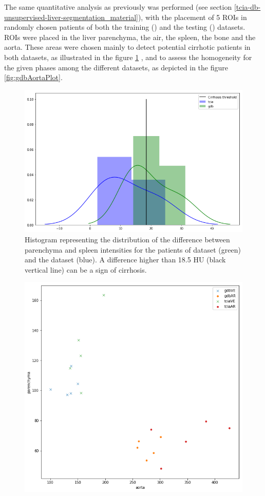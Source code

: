 {\begin{figure}[!ht]
\end{figure}
The same quantitative analysis as previously was performed (see section \ref{tcia-db-unsupervised-liver-segmentation_material}), with the placement of 5 ROIs in randomly chosen patients of both the training (\textbf{}) and the testing (\textbf{}) datasets. ROIs were placed in the liver parenchyma, the air, the spleen, the bone and the aorta. These areas were chosen mainly to detect potential cirrhotic patients in both datasets, as illustrated in the figure \ref{fig:cirrhoticPatPlot} , and to assess the homogeneity for the given phases among the different datasets, as depicted in the figure \ref{fig:gdbAortaPlot}. 
\begin{figure}[!ht]
	\begin{mdframed}[backgroundcolor=blue!50,linecolor=blue!50]
		\centering
		\includegraphics[width=0.6\linewidth]{images/Gdb_TCIA_cirrhosisPlot}
		\caption{Histogram representing the distribution of the difference between parenchyma and spleen intensities for the patients of  \textbf{} dataset (green) and the  \textbf{} dataset (blue). A difference higher than 18.5 HU (black vertical line) can be a sign of cirrhosis.
		}
		\label{fig:cirrhoticPatPlot}
	\end{mdframed}
\end{figure}
\begin{figure}[!ht]
	\begin{mdframed}[backgroundcolor=blue!50,linecolor=blue!50]
		\centering
		\includegraphics[width=0.6\linewidth]{images/AortaParPlot_Gdb}

\end{mdframed}
\end{figure}}
